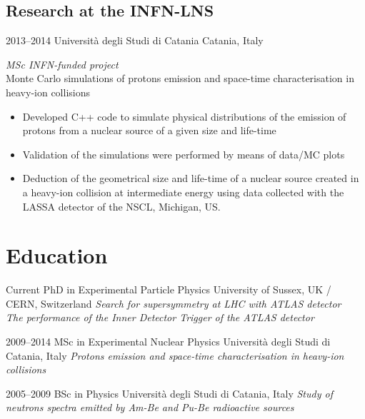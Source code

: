 \documentclass[print]{cv} %
\begin{document}
  \subsection{Research at the INFN-LNS}

  \begin{entrylist}
    \entry
        {2013--2014}
        {Università degli Studi di Catania}
        {Catania, Italy}
        {\emph{MSc INFN-funded project}\\
        Monte Carlo simulations of protons emission and space-time characterisation in heavy-ion collisions
        \begin{itemize}
          \item Developed C++ code to simulate physical distributions of the emission of protons from a nuclear source of a given size and life-time
          \item Validation of the simulations were performed by means of data/MC plots 
          \item Deduction of the geometrical size and life-time of a nuclear source created in a heavy-ion collision at intermediate energy using data collected with the LASSA detector of the NSCL, Michigan, US.
        \end{itemize}
        }

  \end{entrylist}

\section{Education}

\begin{entrylist}
  \entry
      {Current}
      {PhD {\normalfont in Experimental Particle Physics}}
      {University of Sussex, UK / CERN, Switzerland}
      {\emph{Search for supersymmetry at LHC with ATLAS detector\\
      The performance of the Inner Detector Trigger of the ATLAS detector}
      }

  \entry
      {2009--2014}
      {MSc {\normalfont in Experimental Nuclear Physics}}
      {Università degli Studi di Catania, Italy}
      {\emph{Protons emission and space-time characterisation in heavy-ion collisions} }

  \entry
      {2005--2009}
      {BSc {\normalfont in Physics}}
      {Università degli Studi di Catania, Italy}
      {\emph{Study of neutrons spectra emitted by Am-Be and Pu-Be radioactive sources} }
\end{entrylist}
\end{document}
